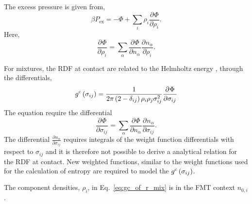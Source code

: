 \documentclass[12pt, letterpaper]{article}
\newcommand*{\pd}[3][]{\frac{\partial^{#1}#2}{\partial{#3}^{#1}}}%
\newcommand*{\lb}{\ensuremath{\left(}}
\newcommand*{\rb}{\ensuremath{\right)}}
\newcommand{\excess}{\ensuremath{\text{ex}}\xspace}
\newcommand{\contact}{\ensuremath{\text{c}}\xspace}
\begin{document}
The excess pressure is given from,
\begin{equation}
  \label{eq:fmt_pressure}
  \beta P_\excess = -\Phi + \underset{i}{\sum} \rho_i \pd{\Phi}{\rho_i}.
\end{equation}
Here,
\begin{equation}
  \label{eq:phi_rho_i}
  \pd{\Phi}{\rho_i}  = \underset{\alpha}{\sum} \pd{\Phi}{n_\alpha} \pd{n_\alpha}{\rho_i}.
\end{equation}

For mixtures, the RDF at contact are related to the Helmholtz energy
\cite[Eq. 5.29]{mulero2008}, \cite{hamad1994} through the
differentials,
\begin{equation}
  \label{eq:gc_of_r_mix}
  g^{\contact}\lb \sigma_{ij} \rb = \frac{1}{2 \pi \lb 2 - \delta_{ij} \rb \rho_i \rho_j \sigma_{ij}^2} \pd{\Phi}{\sigma_{ij}}
\end{equation}
The equation require the differential
\begin{equation}
  \label{eq:phi_sigma_ij}
  \pd{\Phi}{\sigma_{ij}} = \underset{\alpha}{\sum} \pd{\Phi}{n_\alpha} \pd{n_\alpha}{\sigma_{ij}}.
\end{equation}
The differential $\pd{n_\alpha}{\sigma_{ij}}$ requires integrals of
the weight function differentials with respect to $\sigma_{ij}$ and it
is therefore not possible to derive a analytical relation for the RDF
at contact. New weighted functions, similar to the weight functions
used for the calculation of entropy are required to model the
$g^{\contact}\lb \sigma_{ij} \rb$.

The component densities, $\rho_i$, in Eq.~\ref{eq:gc_of_r_mix} is in
the FMT context $n_{0,i}$.

\end{document}
